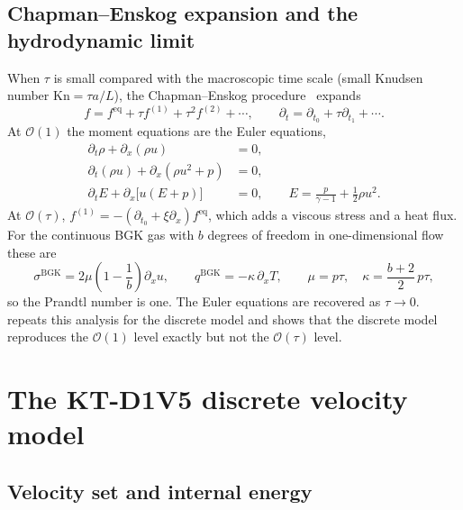 \documentclass[11pt]{article}
\theoremstyle{remark}
\newcommand{\feq}{f^{\mathrm{eq}}}
\newcommand{\Kn}{\mathrm{Kn}}
\newcommand{\ord}{\mathcal{O}}
\begin{document}
\subsection{Chapman--Enskog expansion and the hydrodynamic limit}
\label{sec:ce_cont}

When $\tau$ is small compared with the macroscopic time scale (small Knudsen
number $\Kn = \tau a/L$), the Chapman--Enskog procedure~\citep{ChapmanCowling1970,Cercignani1988}
expands
\begin{equation}
  f = \feq + \tau f^{(1)} + \tau^2 f^{(2)} + \cdots,\qquad
  \partial_t = \partial_{t_0} + \tau\partial_{t_1} + \cdots .
\end{equation}
At $\ord(1)$ the moment equations are the Euler equations,
\begin{align}
  \partial_t \rho + \partial_x(\rho u) &= 0, \label{eq:euler_mass}\\
  \partial_t (\rho u) + \partial_x(\rho u^2 + p) &= 0, \label{eq:euler_mom}\\
  \partial_t E + \partial_x\bigl[u(E+p)\bigr] &= 0, \qquad E = \frac{p}{\gamma-1}+\frac12\rho u^2 . \label{eq:euler_energy}
\end{align}
At $\ord(\tau)$, $f^{(1)} = -(\partial_{t_0} + \xi\partial_x)\feq$, which adds a
viscous stress and a heat flux.  For the continuous BGK gas with $b$ degrees of
freedom in one-dimensional flow these are
\begin{equation}
  \sigma^{\mathrm{BGK}} = 2\mu\left(1-\frac1b\right)\partial_x u,\qquad
  q^{\mathrm{BGK}} = -\kappa\,\partial_x T,\qquad
  \mu = p\tau,\quad \kappa = \frac{b+2}{2}\,p\tau ,
  \label{eq:bgk_transport}
\end{equation}
so the Prandtl number is one.  The Euler equations are recovered as $\tau\to0$.
 repeats this analysis for the discrete model and shows that
the discrete model reproduces the $\ord(1)$ level exactly but not the $\ord(\tau)$ level.

\section{The KT-D1V5 discrete velocity model}
\label{sec:model}

\subsection{Velocity set and internal energy}
\end{document}
